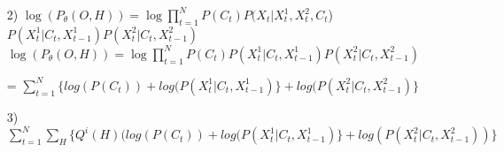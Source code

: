 \documentclass[12pt]{article}
\begin{document}
\begin{enumerate}
\begin{enumerate}
	\item[2)] $\log(P_\theta(O, H)) = \log \prod_{t=1}^N P(C_t) P(X_t | X_t^1, X_t^2, C_t$)$P(X^1_t | C_t, X^1_{t-1})P(X^2_t | C_t, X^2_{t-1})$
	$\log(P_\theta(O, H)) = \log \prod_{t=1}^N P(C_t)P(X^1_t | C_t, X^1_{t-1})P(X^2_t | C_t, X^2_{t-1})$
	
	= $\sum_{t=1}^N \{ log(P(C_t)) + log(P(X^1_t | C_t, X^1_{t-1})\} + log(P(X^2_t | C_t, X^2_{t-1})\}$
	
	\item[3)] $\sum_{t=1}^N \sum_{H} \{ Q^i(H)( log(P(C_t)) + log(P(X^1_t | C_t, X^1_{t-1})\} + log(P(X^2_t | C_t, X^2_{t-1})) \}$ 
	\end{enumerate}

\end{enumerate}
\end{document}
